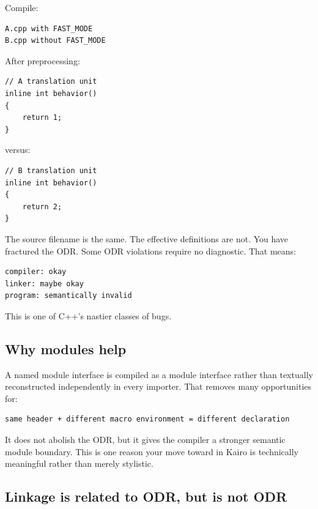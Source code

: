 Compile:

\begin{verbatim}
A.cpp with FAST_MODE
B.cpp without FAST_MODE
\end{verbatim}

After preprocessing:

\begin{verbatim}
// A translation unit
inline int behavior()
{
    return 1;
}
\end{verbatim}

versus:

\begin{verbatim}
// B translation unit
inline int behavior()
{
    return 2;
}
\end{verbatim}

The source filename is the same. The effective definitions are not. You have fractured the ODR. Some ODR violations require no diagnostic. That means:

\begin{verbatim}
compiler: okay
linker: maybe okay
program: semantically invalid
\end{verbatim}

This is one of C++'s nastier classes of bugs.

\subsection{Why modules help}\label{05-engine-i-ch002-why-modules-help}

\hypertarget{05-engine-i-ch002-why-modules-help}{}

A named module interface is compiled as a module interface rather than textually reconstructed independently in every importer. That removes many opportunities for:

\begin{verbatim}
same header + different macro environment = different declaration
\end{verbatim}

It does not abolish the ODR, but it gives the compiler a stronger semantic module boundary. This is one reason your move toward  in Kairo is technically meaningful rather than merely stylistic.

\subsection{Linkage is related to ODR, but is not ODR}\label{05-engine-i-ch002-linkage-is-related-to-odr-but-is-not-odr}

